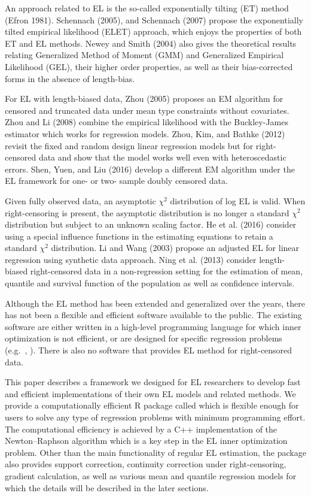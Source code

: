 \documentclass[article]{jss}
\renewcommand{\|}{\,|\,}
\begin{document}
An approach related to EL is the so-called exponentially tilting (ET) method (Efron 1981). Schennach (2005), and Schennach (2007) propose the exponentially tilted empirical likelihood (ELET) approach, which enjoys the properties of both ET and EL methods. Newey and Smith (2004) also gives the theoretical results relating Generalized Method of Moment (GMM) and Generalized Empirical Likelihood (GEL), their higher order properties, as well as their bias-corrected forms in the absence of length-bias.

For EL with length-biased data, Zhou (2005) proposes an EM algorithm for censored and truncated data under mean type constraints without covariates. Zhou and Li (2008) combine the empirical likelihood with the Buckley-James estimator which works for regression models. Zhou, Kim, and Bathke (2012) revisit the fixed and random design linear regression models but for right-censored data and show that the model works well even with heteroscedastic errors. Shen, Yuen, and Liu (2016) develop a different EM algorithm under the EL framework for one- or two- sample doubly censored data.

Given fully observed data, an asymptotic \(\chi^2\) distribution of log EL is valid. When right-censoring is present, the asymptotic distribution is no longer a standard \(\chi^2\) distribution but subject to an unknown scaling factor. He et al. (2016) consider using a special influence functions in the estimating equations to retain a standard \(\chi^2\) distribution. Li and Wang (2003) propose an adjusted EL for linear regression using synthetic data approach. Ning et al. (2013) consider length-biased right-censored data in a non-regression setting for the estimation of mean, quantile and survival function of the population as well as confidence intervals.

Although the EL method has been extended and generalized over the years, there has not been a flexible and efficient software available to the public. The existing software are either written in a high-level programming language for which inner optimization is not efficient, or are designed for specific regression problems (e.g.~, ). There is also no software that provides EL method for right-censored data.

This paper describes a framework we designed for EL researchers to develop fast and efficient implementations of their own EL models and related methods. We provide a computationally efficient R package called  which is flexible enough for users to solve any type of regression problems with minimum programming effort. The computational efficiency is achieved by a C++ implementation of the Newton--Raphson algorithm which is a key step in the EL inner optimization problem. Other than the main functionality of regular EL estimation, the package also provides support correction, continuity correction under right-censoring, gradient calculation, as well as various mean and quantile regression models for which the details will be described in the later sections.
\end{document}
